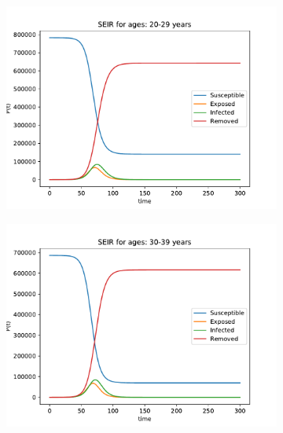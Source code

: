 \begin{figure}[H]
\begin{subfigure}{0.40\textwidth}
\includegraphics[width = \textwidth]{../fig/SEIR_20-29_q.pdf}
\caption{\protect}
\end{subfigure}
\begin{subfigure}{0.40\textwidth}
\includegraphics[width = \textwidth]{../fig/SEIR_30-39_q.pdf}
\caption{\protect}
\end{subfigure}
\begin{subfigure}{0.40\textwidth}

\end{subfigure}
\end{figure}
